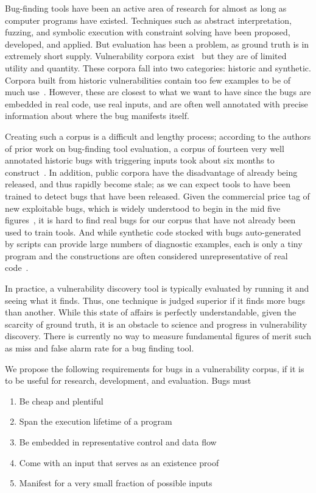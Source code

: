 \label{sec:motivation}

Bug-finding tools have been an active area of research for almost as long as computer programs have existed. 
Techniques such as abstract interpretation, fuzzing, and symbolic execution with constraint solving have been proposed, developed, and applied.
But evaluation has been a problem, as  ground truth is in extremely short supply.
Vulnerability corpora exist~\cite{Kass:2005} but they are of limited utility and quantity.
These corpora fall into two categories: historic and synthetic.
Corpora built from historic vulnerabilities contain too few examples to be of much use~\cite{Zitser:2004}.
However, these are closest to what we want to have since the bugs are embedded in real code, use real inputs, and are often well annotated with precise information about where the bug manifests itself.

Creating such a corpus is a difficult and lengthy process; according to the authors of prior work on bug-finding tool evaluation, a corpus of fourteen very well annotated historic bugs with triggering inputs took about six months to construct~\cite{ActuallyTim}.
In addition, public corpora have the disadvantage of already being released, and thus rapidly become stale; as we can expect tools to have been trained to detect bugs that have been released.
Given the commercial price tag of new exploitable bugs, which is widely understood to begin in the mid five figures~\cite{Tsyrklevich:2015}, it is hard to find real bugs for our corpus that have not already been used to train tools.
And while synthetic code stocked with bugs auto-generated by scripts can provide large numbers of diagnostic examples, each is only a tiny program and the constructions are often considered unrepresentative of real code~\cite{Juliet:2012,Kratkiewicz:2005}.

In practice, a vulnerability discovery tool is typically evaluated by running it and seeing what it finds. 
Thus, one technique is judged superior if it finds more bugs than another.
While this state of affairs is perfectly understandable, given the scarcity of ground truth, it is an obstacle to science and progress in vulnerability discovery.
There is currently no way to measure fundamental figures of merit such as miss and false alarm rate for a bug finding tool.

We propose the following requirements for bugs in a vulnerability corpus, if it is to be useful for research, development, and evaluation.
Bugs must

\begin{enumerate}
\item Be cheap and plentiful
\item Span the execution lifetime of a program
\item Be embedded in representative control and data flow
\item Come with an input that serves as an existence proof 
\item Manifest for a very small fraction of possible inputs
\end {enumerate}

